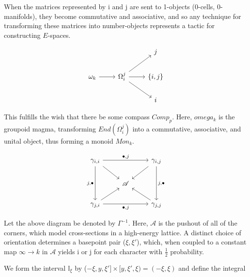 \documentclass{article}
\begin{document}
		When the matrices represented by i and j are sent to 1-objects (0-cells, 0-manifolds), they become commutative and associative, and so any technique for transforming these matrices into number-objects represents a tactic for constructing $E$-spaces.
		
		\[\begin{tikzcd}
			&& j \\
			{\omega_k} & {\Omega_i^j} & {\{i,j\}} \\
			&& i
			\arrow[from=2-2, to=1-3]
			\arrow[from=2-2, to=2-3]
			\arrow[from=2-2, to=3-3]
			\arrow[from=2-1, to=2-2]
		\end{tikzcd}\]
		
		This fulfills the wish that there be some compass $Comp_p$. Here, $omega_k$ is the groupoid magma, transforming $End(\Omega_i^j)$ into a commutative, associative, and unital object, thus forming a monoid $Mon_k$.
		
		\[\begin{tikzcd}
			{\gamma_{i,i}} && {\gamma_{i,j}} \\
			& {\mathscr{A}} \\
			{\gamma_{j,i}} && {\gamma_{j,j}}
			\arrow["{\bullet,j}", from=1-1, to=1-3]
			\arrow["{j,\bullet}"', from=1-1, to=3-1]
			\arrow["{j,\bullet}", from=1-3, to=3-3]
			\arrow["{\bullet,j}"', from=3-1, to=3-3]
			\arrow[from=1-1, to=2-2]
			\arrow[from=3-1, to=2-2]
			\arrow[from=3-3, to=2-2]
			\arrow[from=1-3, to=2-2]
		\end{tikzcd}\]
		
		Let the above diagram be denoted by $\Gamma^{-1}.$ Here, $\mathscr{A}$ is the pushout of all of the corners, which model cross-sections in a high-energy lattice. A distinct choice of orientation determines a basepoint pair ($\xi,\xi'$), which, when coupled to a constant map $\infty\to k$ in $\mathscr{A}$ yields i or j for each character with $\frac{1}{2}$ probability.
		
		We form the interval $\mathbb{I}_\xi$ by ($-\xi,y,\xi'] \times [y, \xi', \xi) = (-\xi,\xi)$ and define the integral
		
\end{document}
